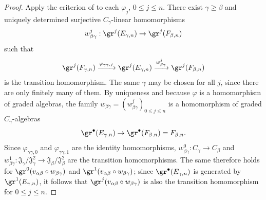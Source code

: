 \begin{proof}
Apply the criterion of  to each $\varphi_j$, $0\leq j\leq n$.
There exist $\gamma\geq\beta$ and uniquely determined surjective $C_\gamma$-linear homomorphisms
\[
  w_{\beta\gamma}^j:\gr^j(E_{\gamma,n})\to\gr^j(F_{\beta,n})
\]
such that
\[
  \gr^j(F_{\gamma,n})\xrightarrow{\varphi_{\gamma\gamma,j}}\gr^j(E_{\gamma,n})\xrightarrow{w_{\beta\gamma}^j}\gr^j(F_{\beta,n})
\]
is the transition homomorphism.
The same $\gamma$ may be chosen for all $j$, since there are only finitely many of them.
By uniqueness and because $\varphi$ is a homomorphism of graded algebras, the family
$w_{\beta\gamma}=(w_{\beta\gamma}^j)_{0\leq j\leq n}$ is a homomorphism of graded $C_\gamma$-algebras
\[
  \gr^\bullet(E_{\gamma,n})\to\gr^\bullet(F_{\beta,n})=F_{\beta,n}.
\]
Since $\varphi_{\gamma\gamma,0}$ and $\varphi_{\gamma\gamma,1}$ are the identity homomorphisms,
$w_{\beta\gamma}^0:C_\gamma\to C_\beta$ and
$w_{\beta\gamma}^1:\mathfrak{J}_\gamma/\mathfrak{J}_\gamma^2
\to\mathfrak{J}_\beta/\mathfrak{J}_\beta^2$ are the transition homomorphisms.
The same therefore holds for
$\gr^0(v_{\alpha\beta}\circ w_{\beta\gamma})$ and
$\gr^1(v_{\alpha\beta}\circ w_{\beta\gamma})$; since
$\gr^\bullet(E_{\gamma,n})$ is generated by $\gr^1(E_{\gamma,n})$, it follows that
$\gr^j(v_{\alpha\beta}\circ w_{\beta\gamma})$ is also the transition homomorphism for $0\leq j\leq n$.


\end{proof}
